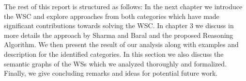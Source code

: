 The rest of this report is structured as follows:
In the next chapter we introduce the WSC and explore approaches from both categories which have made significant contributions towards solving the WSC. In chapter 3 we discuss in more details the approach by Sharma and Baral \cite{2018CommonsenseKT} and the proposed Reasoning Algorithm.
We then present the result of our analysis along with examples and description for the identified categories. In this section we also discuss the semantic graphs of the WSs which we analyzed thoroughly and formalized. Finally, we give concluding remarks and ideas for potential future work. 


